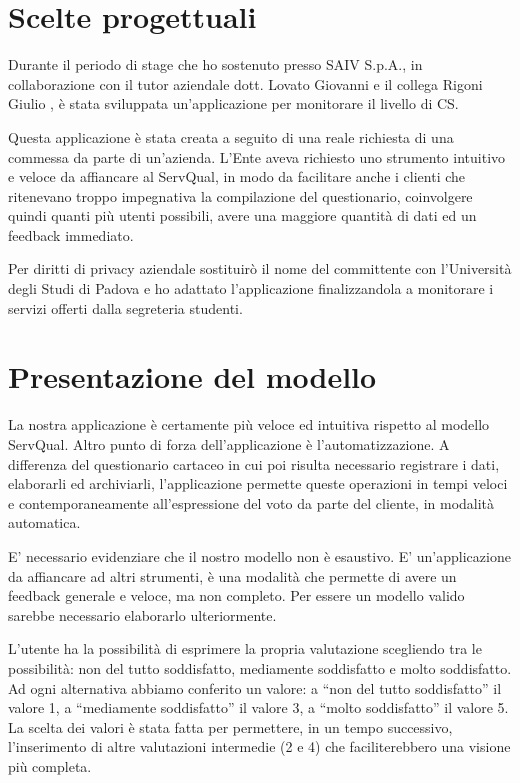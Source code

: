  \section{Scelte progettuali}
Durante il periodo di stage che ho sostenuto presso SAIV S.p.A., in
collaborazione con il tutor aziendale dott. Lovato Giovanni e il collega Rigoni
Giulio , è stata sviluppata un'applicazione per monitorare il livello di CS.

Questa applicazione è stata creata a seguito di una reale richiesta di una
commessa da parte di un'azienda. L'Ente aveva richiesto uno strumento intuitivo
e veloce da affiancare al ServQual, in modo da facilitare anche i clienti che
ritenevano troppo impegnativa la compilazione del questionario, coinvolgere
quindi quanti più utenti possibili, avere una maggiore quantità di dati ed un
feedback immediato.

Per diritti di privacy aziendale sostituirò il nome del committente con
l'Università degli Studi di Padova e ho adattato l'applicazione finalizzandola a
monitorare i servizi offerti dalla segreteria studenti.

\section{Presentazione del modello}

La nostra applicazione è certamente più veloce ed intuitiva rispetto al modello
ServQual.
Altro punto di forza dell'applicazione è l'automatizzazione. A differenza del
questionario cartaceo in cui poi risulta necessario registrare i dati,
elaborarli ed archiviarli, l'applicazione permette queste operazioni in tempi
veloci e contemporaneamente all'espressione del voto da parte del cliente, in
modalità automatica.

E' necessario evidenziare che il nostro modello non è esaustivo. E'
un'applicazione da affiancare ad altri strumenti, è una modalità che permette di
avere un feedback generale e veloce, ma non completo. Per essere un modello
valido sarebbe necessario elaborarlo ulteriormente.

L'utente ha la possibilità di esprimere la propria valutazione scegliendo tra le
possibilità: non del tutto soddisfatto, mediamente soddisfatto e molto
soddisfatto. Ad ogni alternativa abbiamo conferito un valore: a ``non del tutto
soddisfatto'' il valore 1, a ``mediamente soddisfatto'' il valore 3, a ``molto
soddisfatto'' il valore 5. La scelta dei valori è stata fatta per permettere, in
un tempo successivo, l'inserimento di altre valutazioni intermedie (2 e 4) che
faciliterebbero una visione più completa.

